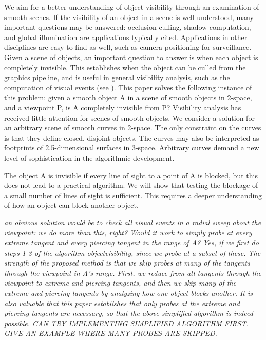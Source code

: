 \documentclass[12pt]{article}
\begin{document}
We aim for a better understanding of object visibility through an
examination of smooth scenes.
If the visibility of an object in a scene is well understood, many important questions
may be answered:
occlusion culling, shadow computation, and global illumination are
applications typically cited.
Applications in other disciplines are easy
to find as well, such as camera positioning for surveillance.
Given a scene of objects, an important question to answer is
when each object is completely invisible.
This establishes when the object can be culled from the graphics pipeline,
and is useful in general visibility analysis, such as the computation
of visual events (see \cite{jj05}).
This paper solves the following instance of this problem:
given a smooth object A in a scene of smooth objects in 2-space, and a viewpoint P,
is A completely invisible from P?
Visibility analysis has received little attention for scenes of smooth objects.
We consider a solution for an arbitrary scene of smooth curves in 2-space.
The only constraint on the curves is that they define closed, disjoint objects.
The curves may also be interpreted as footprints of 2.5-dimensional surfaces
in 3-space.
Arbitrary curves demand a new level of sophistication in the algorithmic development.

The object A is invisible if every line of sight to a point of A is blocked, but this 
does not lead to a practical algorithm.
We will show that testing the blockage of a small number of lines of sight is sufficient.
This requires a deeper understanding of how an object can block another object.

{\em an obvious solution would be to check all visual events in a radial sweep about 
the viewpoint: we do more than this, right?
Would it work to simply probe at every extreme tangent and every piercing tangent
in the range of A?
Yes, if we first do steps 1-3 of the algorithm {\em objectvisibility}, 
since we probe at a subset of these.
The strength of the proposed method is that we skip probes at many of the
tangents through the viewpoint in A's range.
First, we reduce from all tangents through the viewpoint to
extreme and piercing tangents, and then we skip many of the extreme and piercing tangents
by analyzing how one object blocks another.
It is also valuable that this paper establishes that only probes at the extreme 
and piercing tangents are necessary, 
so that the above simplified algorithm is indeed possible.
CAN TRY IMPLEMENTING SIMPLIFIED ALGORITHM FIRST.
GIVE AN EXAMPLE WHERE MANY PROBES ARE SKIPPED.}
\end{document}
